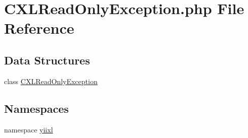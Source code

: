 \hypertarget{CXLReadOnlyException_8php}{
\section{CXLReadOnlyException.php File Reference}
\label{CXLReadOnlyException_8php}
}
\subsection*{Data Structures}
\begin{DoxyCompactItemize}
\item 
class \hyperlink{classCXLReadOnlyException}{CXLReadOnlyException}
\end{DoxyCompactItemize}
\subsection*{Namespaces}
\begin{DoxyCompactItemize}
\item 
namespace \hyperlink{namespaceyiixl}{yiixl}
\end{DoxyCompactItemize}

